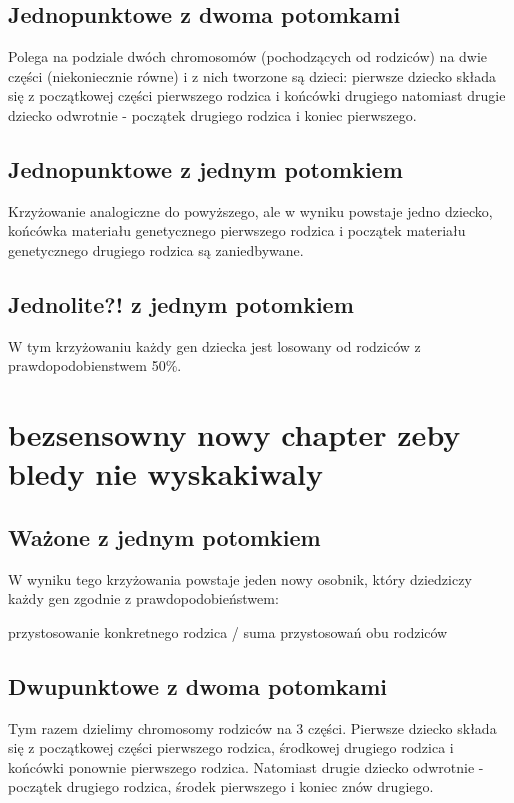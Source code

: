 \documentclass[11pt]{aghdpl}
\begin{document}
\section{Jednopunktowe z dwoma potomkami}
\label{sec:jedenDwa}
Polega na podziale dwóch chromosomów (pochodzących od rodziców) na dwie części (niekoniecznie równe) i z nich tworzone są dzieci: pierwsze dziecko składa się z początkowej części pierwszego rodzica i końcówki drugiego natomiast drugie dziecko odwrotnie - początek drugiego rodzica i koniec pierwszego.

\section{Jednopunktowe z jednym potomkiem}
\label{sec:jedenJeden}
Krzyżowanie analogiczne do powyższego, ale w wyniku powstaje jedno dziecko, końcówka materiału genetycznego pierwszego rodzica i początek materiału genetycznego drugiego rodzica są zaniedbywane.

\section{Jednolite?! z jednym potomkiem}
\label{sec:uniform}
W tym krzyżowaniu każdy gen dziecka jest losowany od rodziców z prawdopodobienstwem 50\%.

\chapter{bezsensowny nowy chapter zeby bledy nie wyskakiwaly}
\label{cha:sorryTakiMamyKlimat}

\section{Ważone z jednym potomkiem}
\label{sec:wazone}
W wyniku tego krzyżowania powstaje jeden nowy osobnik, który dziedziczy każdy gen zgodnie z prawdopodobieństwem:
\begin{center}
przystosowanie konkretnego rodzica / suma przystosowań obu rodziców
\end{center}

\section{Dwupunktowe z dwoma potomkami}
\label{sec:dwaDwa}
Tym razem dzielimy chromosomy rodziców na 3 części. Pierwsze dziecko składa się z początkowej części pierwszego rodzica, środkowej drugiego rodzica i końcówki ponownie pierwszego rodzica. Natomiast drugie dziecko odwrotnie - początek drugiego rodzica, środek pierwszego i koniec znów drugiego.
\end{document}
